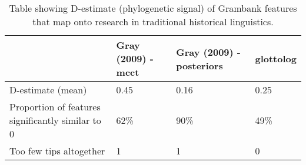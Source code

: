 \begin{table}[ht]
\centering
\begin{tabular}{p{6cm}p{2.2cm}p{2.2cm}p{2.2cm}}
  \hline
  & Gray (2009) - mcct & Gray (2009) - posteriors & glottolog \\ 
  \hline
D-estimate (mean) & 0.45 & 0.16 & 0.25 \\ 
  Proportion of features significantly similar to 0 & 62\% & 90\% & 49\% \\ 
  Too few tips altogether & 1 & 1 & 0 \\ 
   \hline
\end{tabular}
\caption{Table showing D-estimate (phylogenetic signal) of Grambank features that map onto research in traditional historical linguistics.} 
\label{d_estimate_summary}
\end{table}
